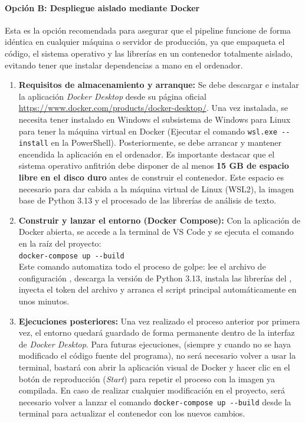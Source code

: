 \paragraph{Opción B: Despliegue aislado mediante Docker}
Esta es la opción recomendada para asegurar que el pipeline funcione de forma idéntica en cualquier máquina o servidor de producción, ya que empaqueta el código, el sistema operativo y las librerías en un contenedor totalmente aislado, evitando tener que instalar dependencias a mano en el ordenador.

\begin{enumerate}
    \item \textbf{Requisitos de almacenamiento y arranque:} Se debe descargar e instalar la aplicación \textit{Docker Desktop} desde su página oficial \url{https://www.docker.com/products/docker-desktop/}. Una vez instalada, se necesita tener instalado en Windows el subsistema de Windows para Linux para tener la máquina virtual en Docker (Ejecutar el comando \texttt{wsl.exe -{}-install} en la PowerShell). Posteriormente, se debe arrancar y mantener encendida la aplicación en el ordenador. Es importante destacar que el sistema operativo anfitrión debe disponer de al menos \textbf{15 GB de espacio libre en el disco duro} antes de construir el contenedor. Este espacio es necesario para dar cabida a la máquina virtual de Linux (WSL2), la imagen base de Python 3.13 y el procesado de las librerías de análisis de texto.
    
    \item \textbf{Construir y lanzar el entorno (Docker Compose):} Con la aplicación de Docker abierta, se accede a la terminal de VS Code y se ejecuta el comando en la raíz del proyecto: \\
    \texttt{docker-compose up -{}-build} \\
    Este comando automatiza todo el proceso de golpe: lee el archivo de configuración , descarga la versión de Python 3.13, instala las librerías del , inyecta el token  del archivo  y arranca el script principal automáticamente en unos minutos.
    
    \item \textbf{Ejecuciones posteriores:} Una vez realizado el proceso anterior por primera vez, el entorno quedará guardado de forma permanente dentro de la interfaz de \textit{Docker Desktop}. Para futuras ejecuciones, (siempre y cuando no se haya modificado el código fuente del programa), no será necesario volver a usar la terminal, bastará con abrir la aplicación visual de Docker y hacer clic en el botón de reproducción (\textit{Start}) para repetir el proceso con la imagen ya compilada. En caso de realizar cualquier modificación en el proyecto, será necesario volver a lanzar el comando \texttt{docker-compose up -{}-build} desde la terminal para actualizar el contenedor con los nuevos cambios.
    

\end{enumerate}

